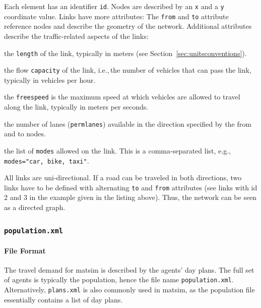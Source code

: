 Each element has an identifier \lstinline|id|. Nodes are described by an \lstinline|x| and a \lstinline|y| coordinate value. Links have more attributes: The \lstinline|from| and \lstinline|to| attribute reference nodes and describe the geometry of the network. Additional attributes describe the traffic-related aspects of the links:
\begin{compactitem}
    \item the \lstinline|length| of the link, typically in meters (see Section~\ref{sec:unitsconventions}).
    \item the flow \lstinline|capacity| of the link, i.e.,\,the number of vehicles that can pass the link, typically in vehicles per hour.
    \item the \lstinline|freespeed| is the maximum speed at which vehicles are allowed to travel along the link, typically in meters per seconds.
    \item the number of lanes (\lstinline|permlanes|) available in the direction specified by the from and to nodes.
    \item the list of \lstinline|modes| allowed on the link. This is a comma-separated list, e.g.,\,\lstinline|modes="car, bike, taxi"|.
\end{compactitem}
All links are uni-directional. If a road can be traveled in both directions, two links have to be defined with alternating \lstinline|to| and \lstinline|from| attributes (see links with id 2 and 3 in the example given in the listing above). Thus, the network can be seen as a directed graph. 

\subsubsection{\lstinline|population.xml|}
\label{sec:lgstarted-population}
\paragraph{File Format}

The travel demand for \gls{matsim} is described by the agents' day plans. The full set of agents is typically the population, hence the file name \lstinline|population.xml|. Alternatively, \lstinline|plans.xml| is also commonly used in \gls{matsim}, as the population file essentially contains a list of day plans.

